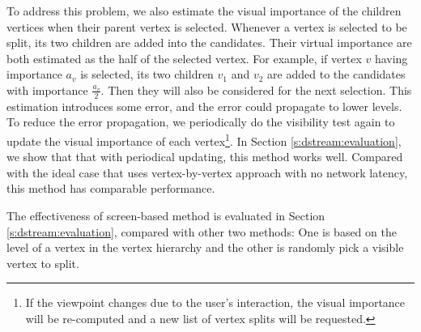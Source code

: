     To address this problem, we also estimate the visual importance of the children vertices
    when their parent vertex is selected. Whenever a vertex is selected to be split, its two children
    are added into the candidates. Their virtual importance are both estimated as the half
    of the selected vertex. For example, if vertex $v$ having importance $a_v$ is selected,
    its two children $v_1$ and $v_2$ are added to the candidates with importance $\frac{a_v}{2}$.
    Then they will also be considered for the next selection.
    This estimation introduces some error, and the error could propagate to
    lower levels. To reduce the error propagation, 
    we periodically do the visibility test again to update the visual importance of 
    each vertex\footnote{ 
    If the viewpoint changes due to the user's interaction, the visual importance will
    be re-computed and a new list of vertex splits will be requested. 
    }.
    In Section \ref{s:dstream:evaluation}, we show that
    that with periodical updating, this method works well. Compared with the ideal case that
    uses vertex-by-vertex approach with no network latency, this method has comparable performance.

    The effectiveness of screen-based method is evaluated in Section \ref{s:dstream:evaluation},
    compared with other two methods: One is based on the level of a vertex in the 
    vertex hierarchy and the other is randomly pick a visible vertex to split.

    
    
